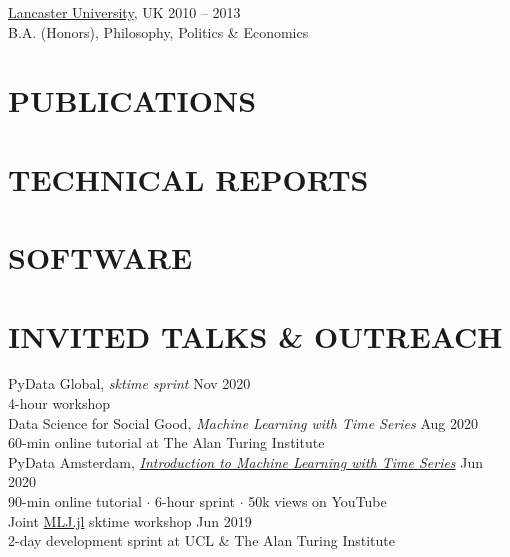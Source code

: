 \documentclass{cv}
\newcommand{\printbibsection}[2]{
\begin{refsection}
\nocite{*}
\printbibliography[sorting=chronological,
                  type={#1},
                  title={#2},
                  heading=none]
\end{refsection}
}
\begin{document}
\href{https://www.lancs.ac.uk/}{Lancaster University}, UK \hfill 2010 -- 2013 \\
B.A. (Honors), Philosophy, Politics \& Economics 

\section{PUBLICATIONS}
\printbibsection{article}{}

\section{TECHNICAL REPORTS}
\printbibsection{proceedings}{}

\section{SOFTWARE}
\printbibsection{misc}{}

\section{INVITED TALKS \& OUTREACH}

PyData Global, \textit{sktime sprint} \hfill Nov 2020 \\
{\color{lightgray} 4-hour workshop} \\

Data Science for Social Good, \textit{Machine Learning with Time Series} \hfill Aug 2020 \\
{\color{lightgray} 60-min online tutorial at The Alan Turing Institute} \\

PyData Amsterdam, \href{https://www.youtube.com/watch?v=wqQKFu41FIw}{\textit{Introduction to Machine Learning with Time Series}} \hfill Jun 2020 \\
{\color{lightgray} 90-min online tutorial $\cdot$ 6-hour sprint $\cdot$ 50k views on YouTube} \\

Joint \href{https://github.com/alan-turing-institute/MLJ.jl}{MLJ.jl} sktime workshop \hfill Jun 2019 \\
{\color{lightgray} 2-day development sprint at UCL \& The Alan Turing Institute} \\
\end{document}
